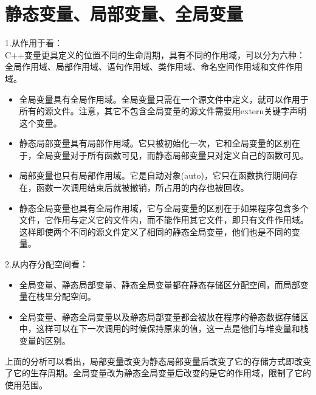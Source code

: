\section{静态变量、局部变量、全局变量}
1.从作用于看：\\
C++变量更具定义的位置不同的生命周期，具有不同的作用域，可以分为六种：全局作用域、局部作用域、语句作用域、类作用域、命名空间作用域和文件作用域。\\
\begin{itemize}
	\item 全局变量具有全局作用域。全局变量只需在一个源文件中定义，就可以作用于所有的源文件。注意，其它不包含全局变量的源文件需要用extern关键字声明这个变量。
	\item 静态局部变量具有局部作用域。它只被初始化一次，它和全局变量的区别在于，全局变量对于所有函数可见，而静态局部变量只对定义自己的函数可见。
	\item 局部变量也只有局部作用域。它是自动对象(auto)，它只在函数执行期间存在，函数一次调用结束后就被撤销，所占用的内存也被回收。
	\item 静态全局变量也具有全局作用域，它与全局变量的区别在于如果程序包含多个文件，它作用与定义它的文件内，而不能作用其它文件，即只有文件作用域。这样即使两个不同的源文件定义了相同的静态全局变量，他们也是不同的变量。
\end{itemize}
2.从内存分配空间看：\\
\begin{itemize}
	\item 全局变量、静态局部变量、静态全局变量都在静态存储区分配空间，而局部变量在栈里分配空间。
	\item 全局变量、静态全局变量以及静态局部变量都会被放在程序的静态数据存储区中，这样可以在下一次调用的时候保持原来的值，这一点是他们与堆变量和栈变量的区别。
\end{itemize}
上面的分析可以看出，局部变量改变为静态局部变量后改变了它的存储方式即改变了它的生存周期。全局变量改为静态全局变量后改变的是它的作用域，限制了它的使用范围。



